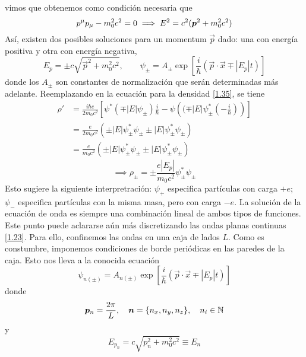 vimos que obtenemos como condición necesaria que
\begin{equation}
  p^\mu p_\mu -m_0^2c^2=0\implies E^2=c^2(\vb*{p}^2+m_0^2c^2)
\end{equation}
Así, existen dos posibles soluciones para un momentum $\vec{p}$ dado: una con energía positiva y otra con energía negativa,
\begin{equation}
  E_p=\pm c\sqrt{\vec{p}^2+m_0^2c^2},\qquad \psi_{\pm }=A_{\pm }\exp\left[\frac{i}{\hbar}(\vec{p}\cdot\vec{x}\mp |E_p|t)\right]
\end{equation}
donde los $A_\pm$ son constantes de normalización que serán determinadas más adelante. Reemplazando en la ecuación para la densidad \eqref{1.35}, se tiene
\begin{align}
  \rho'&=\frac{i\hbar e}{2m_0c^2}\left[\psi^*(\mp |E|\psi_{\pm })\frac{i}{\hbar}-\psi\left((\mp |E|\psi^*_{\pm }\left(-\frac{i}{\hbar}\right)\right)\right]\\
  &=\frac{e}{2m_0c^2}\left(\pm |E|\psi^*_{\pm}\psi_{\pm }\pm |E|\psi^*_\pm \psi_\pm \right)\\
  &=\frac{e}{m_0c^2}\left(\pm |E|\psi^*_{\pm}\psi_{\pm }\pm |E|\psi^*_\pm \psi_\pm \right)
\end{align}
\begin{equation}\label{1.39}
  \implies \boxed{\rho_\pm =\pm\frac{e|E_p|}{m_0c^2}\psi^*_\pm \psi_\pm }
\end{equation}
Esto sugiere la siguiente interpretración: $\psi_+$ especifica partículas con carga $+e$; $\psi_-$ especifica partículas con la misma masa, pero con carga $-e$. La solución de la ecuación de onda es siempre una combinación lineal de ambos tipos de funciones. Este punto puede aclararse aún más discretizando las ondas planas continuas \eqref{1.23}. Para ello, confinemos las ondas en una caja de lados $L$. Como es constumbre, imponemos condiciones de borde periódicas en las paredes de la caja. Esto nos lleva a la conocida ecuación
\begin{equation}
  \psi_{n(\pm )}=A_{n(\pm )}\exp\left[\frac{i}{\hbar}(\vec{p}\cdot\vec{x}\mp |E_p|t)\right]
\end{equation}
donde
\begin{equation}
  \vb*{p}_n=\frac{2\pi }{L},\quad \vb*{n}=\{n_x,n_y,n_z\},\quad n_i\in\mathbb{N}
\end{equation}
y
\begin{equation}
  E_{p_n}=c\sqrt{p_n^2+m_0^2c^2}\equiv E_n
\end{equation}

